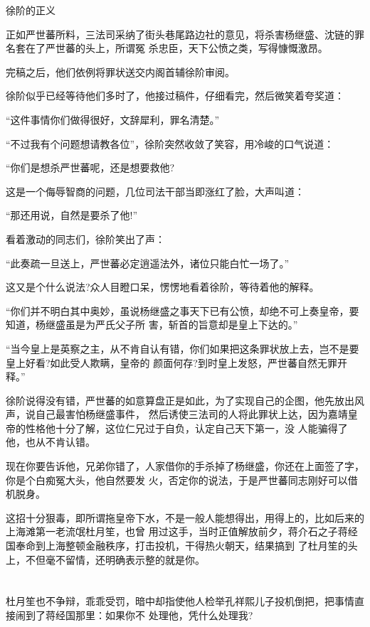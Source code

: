 \documentclass[11pt,a4paper,onecolumn]{article}
\begin{document}
徐阶的正义

正如严世蕃所料，三法司采纳了街头巷尾路边社的意见，将杀害杨继盛、沈链的罪名套在了严世蕃的头上，所谓冤
杀忠臣，天下公愤之类，写得慷慨激昂。

完稿之后，他们依例将罪状送交内阁首辅徐阶审阅。

徐阶似乎已经等待他们多时了，他接过稿件，仔细看完，然后微笑着夸奖道：

``这件事情你们做得很好，文辞犀利，罪名清楚。''

``不过我有个问题想请教各位''，徐阶突然收敛了笑容，用冷峻的口气说道：

``你们是想杀严世蕃呢，还是想要救他?

这是一个侮辱智商的问题，几位司法干部当即涨红了脸，大声叫道：

``那还用说，自然是要杀了他!''

看着激动的同志们，徐阶笑出了声：

``此奏疏一旦送上，严世蕃必定逍遥法外，诸位只能白忙一场了。''

这又是个什么说法?众人目瞪口呆，愣愣地看着徐阶，等待着他的解释。

``你们并不明白其中奥妙，虽说杨继盛之事天下已有公愤，却绝不可上奏皇帝，要知道，杨继盛虽是为严氏父子所
害，斩首的旨意却是皇上下达的。''

``当今皇上是英察之主，从不肯自认有错，你们如果把这条罪状放上去，岂不是要皇上好看?如此受人欺瞒，皇帝的
颜面何存?到时皇上发怒，严世蕃自然无罪开释。''

徐阶说得没有错，严世蕃的如意算盘正是如此，为了实现自己的企图，他先放出风声，说自己最害怕杨继盛事件，
然后诱使三法司的人将此罪状上达，因为嘉靖皇帝的性格他十分了解，这位仁兄过于自负，认定自己天下第一，没
人能骗得了他，也从不肯认错。

现在你要告诉他，兄弟你错了，人家借你的手杀掉了杨继盛，你还在上面签了字，你是个白痴冤大头，他自然要发
火，否定你的说法，于是严世蕃同志刚好可以借机脱身。

这招十分狠毒，即所谓拖皇帝下水，不是一般人能想得出，用得上的，比如后来的上海滩第一老流氓杜月笙，也曾
用过这手，当时正值解放前夕，蒋介石之子蒋经国奉命到上海整顿金融秩序，打击投机，干得热火朝天，结果搞到
了杜月笙的头上，不但毫不留情，还明确表示整的就是你。

\section[\thesection]{}

杜月笙也不争辩，乖乖受罚，暗中却指使他人检举孔祥熙儿子投机倒把，把事情直接闹到了蒋经国那里：如果你不
处理他，凭什么处理我?
\end{document}
